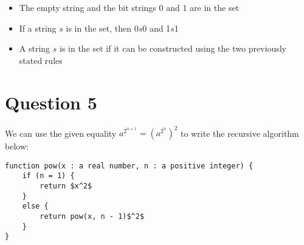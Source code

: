 \documentclass[11pt]{article}
\begin{document}
\begin{itemize}
    \item The empty string and the bit strings 0 and 1 are in the set
    \item If a string $s$ is in the set, then 0$s$0 and 1$s$1
    \item A string $s$ is in the set if it can be constructed using the two previously stated rules
\end{itemize}

\section*{Question 5}
We can use the given equality $a^{2^{n+1}} = (a^{2^{n}})^2$ to write the recursive algorithm below:

\begin{lstlisting}[mathescape=true]
function pow(x : a real number, n : a positive integer) {
    if (n = 1) {
        return $x^2$
    }
    else {
        return pow(x, n - 1)$^2$
    }
}
\end{lstlisting}
\end{document}
